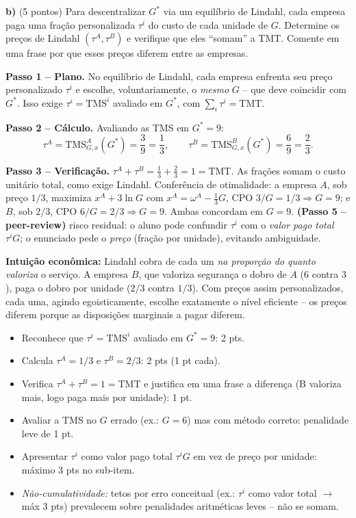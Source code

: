 \textbf{b)} (5 pontos) Para descentralizar $G^*$ via um equil\'ibrio de Lindahl, cada empresa paga uma fra\c{c}\~ao personalizada $\tau^i$ do custo de cada unidade de $G$. Determine os pre\c{c}os de Lindahl $(\tau^A, \tau^B)$ e verifique que eles ``somam'' a TMT. Comente em uma frase por que esses pre\c{c}os diferem entre as empresas.
\resolucaobox{7.6cm}
\begin{solucao}
\textbf{Passo 1 -- Plano.} No equil\'ibrio de Lindahl, cada empresa enfrenta seu pre\c{c}o personalizado $\tau^i$ e escolhe, voluntariamente, o \emph{mesmo} $G$ -- que deve coincidir com $G^*$. Isso exige $\tau^i = \text{TMS}^i$ avaliado em $G^*$, com $\sum_i \tau^i = \text{TMT}$.

\textbf{Passo 2 -- C\'alculo.} Avaliando as TMS em $G^*=9$:
\[ \tau^A = \text{TMS}^A_{G,x}(G^*) = \frac{3}{9} = \frac{1}{3}, \qquad \tau^B = \text{TMS}^B_{G,x}(G^*) = \frac{6}{9} = \frac{2}{3}. \]

\textbf{Passo 3 -- Verifica\c{c}\~ao.} $\tau^A + \tau^B = \tfrac{1}{3} + \tfrac{2}{3} = 1 = \text{TMT}$. As fra\c{c}\~oes somam o custo unit\'ario total, como exige Lindahl. Confer\^encia de otimalidade: a empresa $A$, sob pre\c{c}o $1/3$, maximiza $x^A + 3\ln G$ com $x^A = \omega^A - \tfrac{1}{3}G$, CPO $3/G = 1/3 \Rightarrow G=9$; e $B$, sob $2/3$, CPO $6/G = 2/3 \Rightarrow G=9$. Ambas concordam em $G=9$. \textbf{(Passo 5 -- peer-review)} risco residual: o aluno pode confundir $\tau^i$ com o \emph{valor pago total} $\tau^i G$; o enunciado pede o \emph{pre\c{c}o} (fra\c{c}\~ao por unidade), evitando ambiguidade.

\textbf{Intui\c{c}\~ao econ\^omica:} Lindahl cobra de cada um \emph{na propor\c{c}\~ao do quanto valoriza} o servi\c{c}o. A empresa $B$, que valoriza seguran\c{c}a o dobro de $A$ ($6$ contra $3$), paga o dobro por unidade ($2/3$ contra $1/3$). Com pre\c{c}os assim personalizados, cada uma, agindo egoisticamente, escolhe exatamente o n\'ivel eficiente -- os pre\c{c}os diferem porque as disposi\c{c}\~oes marginais a pagar diferem.
\rubricalabel
\begin{itemize}\item Reconhece que $\tau^i = \text{TMS}^i$ avaliado em $G^*=9$: 2 pts.\item Calcula $\tau^A = 1/3$ e $\tau^B = 2/3$: 2 pts (1 pt cada).\item Verifica $\tau^A + \tau^B = 1 = \text{TMT}$ e justifica em uma frase a diferen\c{c}a (B valoriza mais, logo paga mais por unidade): 1 pt.\item Avaliar a TMS no $G$ errado (ex.: $G=6$) mas com m\'etodo correto: penalidade leve de 1 pt.\item Apresentar $\tau^i$ como valor pago total $\tau^i G$ em vez de pre\c{c}o por unidade: m\'aximo 3 pts no sub-item.\item \emph{N\~ao-cumulatividade:} tetos por erro conceitual (ex.: $\tau^i$ como valor total $\to$ m\'ax 3 pts) prevalecem sobre penalidades aritm\'eticas leves -- n\~ao se somam.\end{itemize}
\end{solucao}


